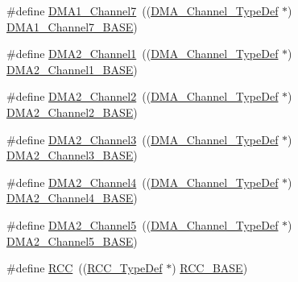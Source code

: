 \begin{DoxyCompactItemize}
\item 
\#define \hyperlink{group___peripheral__declaration_ga4f9c23b3d1add93ed206b5c9afa5cda3}{D\+M\+A1\+\_\+\+Channel7}~((\hyperlink{struct_d_m_a___channel___type_def}{D\+M\+A\+\_\+\+Channel\+\_\+\+Type\+Def} $\ast$) \hyperlink{openmotestm_2library_2inc_2stm32f10x__map_8h_aeee0d1f77d0db1db533016a09351166c}{D\+M\+A1\+\_\+\+Channel7\+\_\+\+B\+A\+SE})
\item 
\#define \hyperlink{group___peripheral__declaration_gad86c75e1ff89e03e15570f47962865c8}{D\+M\+A2\+\_\+\+Channel1}~((\hyperlink{struct_d_m_a___channel___type_def}{D\+M\+A\+\_\+\+Channel\+\_\+\+Type\+Def} $\ast$) \hyperlink{openmotestm_2library_2inc_2stm32f10x__map_8h_ad3bd6c4201d12f5d474518c1b02f8e3b}{D\+M\+A2\+\_\+\+Channel1\+\_\+\+B\+A\+SE})
\item 
\#define \hyperlink{group___peripheral__declaration_ga316024020799373b9d8e35c316c74f24}{D\+M\+A2\+\_\+\+Channel2}~((\hyperlink{struct_d_m_a___channel___type_def}{D\+M\+A\+\_\+\+Channel\+\_\+\+Type\+Def} $\ast$) \hyperlink{openmotestm_2library_2inc_2stm32f10x__map_8h_a22f39f23c879c699b88e04a629f69d1c}{D\+M\+A2\+\_\+\+Channel2\+\_\+\+B\+A\+SE})
\item 
\#define \hyperlink{group___peripheral__declaration_ga6dca52a79587e0ca9a5d669048b4c7eb}{D\+M\+A2\+\_\+\+Channel3}~((\hyperlink{struct_d_m_a___channel___type_def}{D\+M\+A\+\_\+\+Channel\+\_\+\+Type\+Def} $\ast$) \hyperlink{openmotestm_2library_2inc_2stm32f10x__map_8h_a6f2369b8bc155fb55a28891987605c2c}{D\+M\+A2\+\_\+\+Channel3\+\_\+\+B\+A\+SE})
\item 
\#define \hyperlink{group___peripheral__declaration_ga612b396657695191ad740b0b59bc9f12}{D\+M\+A2\+\_\+\+Channel4}~((\hyperlink{struct_d_m_a___channel___type_def}{D\+M\+A\+\_\+\+Channel\+\_\+\+Type\+Def} $\ast$) \hyperlink{openmotestm_2library_2inc_2stm32f10x__map_8h_a01b063266473f290a55047654fbbfbee}{D\+M\+A2\+\_\+\+Channel4\+\_\+\+B\+A\+SE})
\item 
\#define \hyperlink{group___peripheral__declaration_ga521c13b7d0f82a6897d47995da392750}{D\+M\+A2\+\_\+\+Channel5}~((\hyperlink{struct_d_m_a___channel___type_def}{D\+M\+A\+\_\+\+Channel\+\_\+\+Type\+Def} $\ast$) \hyperlink{openmotestm_2library_2inc_2stm32f10x__map_8h_a1eea983a5d68bf36f4d19fbb07955ca1}{D\+M\+A2\+\_\+\+Channel5\+\_\+\+B\+A\+SE})
\item 
\#define \hyperlink{group___peripheral__declaration_ga74944438a086975793d26ae48d5882d4}{R\+CC}~((\hyperlink{struct_r_c_c___type_def}{R\+C\+C\+\_\+\+Type\+Def} $\ast$) \hyperlink{openmotestm_2library_2inc_2stm32f10x__map_8h_a0e681b03f364532055d88f63fec0d99d}{R\+C\+C\+\_\+\+B\+A\+SE})

\end{DoxyCompactItemize}
